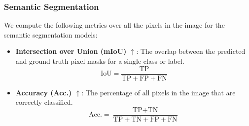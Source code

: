 \subsubsection{Semantic Segmentation}
We compute the following metrics over all the pixels in the image for the semantic segmentation models:
\begin{itemize}
	\item \textbf{Intersection over Union (mIoU) $\uparrow$}: The overlap between the predicted and ground truth pixel masks for a single class or label.
	      \begin{equation}
		      \text{IoU} = \frac{\text{TP}}{\text{TP} + \text{FP} + \text{FN}}
	      \end{equation}

	\item \textbf{Accuracy (Acc.) $\uparrow$}: The percentage of all pixels in the image that are correctly classified.
	      \begin{equation}
		      \text{Acc.} = \frac{\text{TP} + \text{TN}}{\text{TP} + \text{TN} + \text{FP} + \text{FN}}
	      \end{equation}
\end{itemize}

